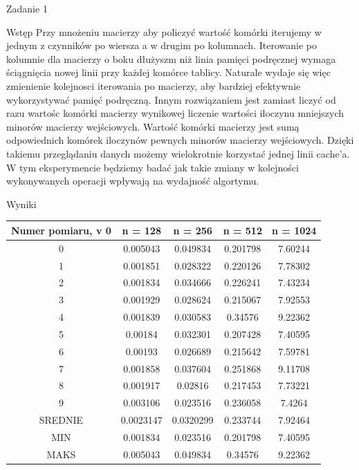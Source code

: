 \documentclass[11pt,wide]{mwart}
\begin{document}
 \begin{section}{Zadanie 1}
  \begin{subsection}{Wstęp}
  Przy mnożeniu macierzy aby policzyć wartość komórki iterujemy w jednym z czynników po wiersza a w drugim po kolumnach. Iterowanie po kolumnie dla macierzy o boku dłużyszm niż linia pamięci podręcznej wymaga ściągnięcia nowej linii przy każdej komórce tablicy. Naturale wydaje się więc zmienienie kolejnosci iterowania po macierzy, aby bardziej efektywnie wykorzystywać pamięć podręczną. 
  Innym rozwiązaniem jest zamiast liczyć od razu wartośc komórki macierzy wynikowej liczenie wartości iloczynu mniejszych minorów macierzy wejściowych. Wartość komórki macierzy jest sumą odpowiednich komórek iloczynów pewnych minorów macierzy wejściowych. Dzięki takiemu przeglądaniu danych możemy wielokrotnie korzystać jednej linii cache'a.
    W tym eksperymencie będziemy badać jak takie zmiany w kolejności wykonywanych operacji wpływają na wydajność algortymu. 
    
    
   \end{subsection}
   \begin{subsection}{Wyniki}

\begin{center}
\begin{tabular}{|c|c|c|c|c|}
\hline
Numer pomiaru, v 0 & n = 128 & n = 256 & n = 512 & n = 1024\\
\hline
0 & 0.005043 & 0.049834 & 0.201798 & 7.60244\\
\hline
1 & 0.001851 & 0.028322 & 0.220126 & 7.78302\\
\hline
2 & 0.001834 & 0.034666 & 0.226241 & 7.43234\\
\hline
3 & 0.001929 & 0.028624 & 0.215067 & 7.92553\\
\hline
4 & 0.001839 & 0.030583 & 0.34576 & 9.22362\\
\hline
5 & 0.00184 & 0.032301 & 0.207428 & 7.40595\\
\hline
6 & 0.00193 & 0.026689 & 0.215642 & 7.59781\\
\hline
7 & 0.001858 & 0.037604 & 0.251868 & 9.11708\\
\hline
8 & 0.001917 & 0.02816 & 0.217453 & 7.73221\\
\hline
9 & 0.003106 & 0.023516 & 0.236058 & 7.4264\\
\hline
SREDNIE & 0.0023147 & 0.0320299 & 0.233744 & 7.92464\\
\hline
MIN & 0.001834 & 0.023516 & 0.201798 & 7.40595\\
\hline
MAKS & 0.005043 & 0.049834 & 0.34576 & 9.22362\\
\hline
\end{tabular}
\end{center}
   

\end{subsection}
\end{section}
\end{document}
